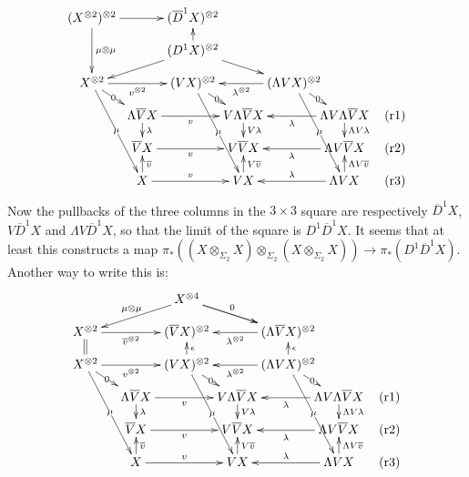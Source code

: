 \documentclass[10pt]{article}
\begin{document}
\begin{Adams Muliplicativity}
\[\xymatrix@R=9mm@C=14mm@!0{
(X^{\otimes 2})^{\otimes 2}\ar[dd]^-{\mu\otimes\mu}
\ar[rr]
&&(\overline{D}^1X)^{\otimes2}
\\
&&(D^1X)^{\otimes2}\ar[dll]\ar[u]
\ar[drr]
\\
X^{\otimes2}\ar[dr]|-{0}
\ar[dddr]|-{\mu}
\ar[rr]_-{{v}^{\otimes2}}
&%
&%
({V}X)^{\otimes2}\ar[dr]|-{0}
\ar[dddr]|-{\mu}
&%
&%
(\Lambda{V}X)^{\otimes2}\ar[dr]|-{0}\ar[ll]^-{\lambda^{\otimes2}}
\ar[dddr]|-{\mu}
&%
\\%
&%
\Lambda \overline{V}X\ar[d]^-{\lambda}
\ar[rr]_-{v}
&%
&%
V\Lambda \overline{V}X\ar[d]^-{V\lambda}
&%
&%
\Lambda V\Lambda\overline{V}X\ar[ll]^-{\lambda}
\ar[d]^-{\Lambda V\lambda}
&\textup{(r1)}
\\%
&%
\overline{V}X
\ar[rr]_-{v}
&%
&%
V\overline{V}X
&%
&%
\Lambda V\overline{V}X\ar[ll]^-{\lambda}
&\textup{(r2)}
\\%
&%
X\ar[u]_-{\overline{v}}
\ar[rr]^-{v}
&%
&%
{V}X\ar[u]_-{V\overline{v}}
&%
&%
\Lambda{V}X\ar[ll]_-{\lambda}
\ar[u]_-{\Lambda V\overline{v}}
&\textup{(r3)}
}\]
Now the pullbacks of the three columns in the $3\times3$ square are respectively $\overline{D}^1X$, $V\overline{D}^1X$ and $\Lambda V\overline{D}^1X$, so that the limit of the square is $D^1\overline{D}^1X$. It seems that at least this constructs a map $\pi_*((X\otimes_{\Sigma_2}X)\otimes_{\Sigma_2}(X\otimes_{\Sigma_2}X))\to \pi_*(D^1\overline{D}^1X)$. Another way to write this is:
\[\xymatrix@R=9mm@C=14mm@!0{
&&X^{\otimes4}\ar[dll]_-{\mu\otimes\mu}\ar[drr]^-{0}
\ar[drr]
\\
X^{\otimes2}
\ar[rr]_-{\overline{v}^{\otimes2}}
&%
&%
(\overline{V}X)^{\otimes2}
&%
&%
(\Lambda\overline{V}X)^{\otimes2}\ar[ll]^-{\lambda^{\otimes2}}
&%
\\
X^{\otimes2}\ar[dr]|-{0}
\ar[dddr]|-{\mu}
\ar[rr]_-{{v}^{\otimes2}}
\ar@{=}[u]
&%
&%
({V}X)^{\otimes2}\ar[dr]|-{0}
\ar[dddr]|-{\mu}
\ar[u]_-{\epsilon}
&%
&%
(\Lambda{V}X)^{\otimes2}\ar[dr]|-{0}\ar[ll]^-{\lambda^{\otimes2}}
\ar[dddr]|-{\mu}
\ar[u]_-{\epsilon}
&%
\\%
&%
\Lambda \overline{V}X\ar[d]^-{\lambda}
\ar[rr]_-{v}
&%
&%
V\Lambda \overline{V}X\ar[d]^-{V\lambda}
&%
&%
\Lambda V\Lambda\overline{V}X\ar[ll]^-{\lambda}
\ar[d]^-{\Lambda V\lambda}
&\textup{(r1)}
\\%
&%
\overline{V}X
\ar[rr]_-{v}
&%
&%
V\overline{V}X
&%
&%
\Lambda V\overline{V}X\ar[ll]^-{\lambda}
&\textup{(r2)}
\\%
&%
X\ar[u]_-{\overline{v}}
\ar[rr]^-{v}
&%
&%
{V}X\ar[u]_-{V\overline{v}}
&%
&%
\Lambda{V}X\ar[ll]_-{\lambda}
\ar[u]_-{\Lambda V\overline{v}}
&\textup{(r3)}
}\]


\end{Adams Muliplicativity}
\end{document}
